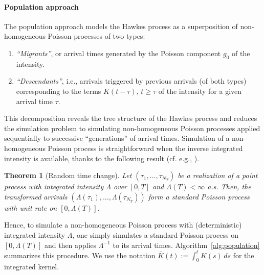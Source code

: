 \documentclass{article}
\newcommand{\1}{\mathbbm{1}}
\newtheorem{theorem}{Theorem}[section]
\numberwithin{equation}{section}
\begin{document}
\paragraph{Population approach}
The population approach \citep{Moller2005} models the Hawkes process as a superposition of non-homogeneous Poisson processes of two types:
\begin{enumerate}
    \item \textit{``Migrants''}, or arrival times generated by the Poisson component $g_0$ of the intensity.
    \item \textit{``Descendants''}, i.e., arrivals triggered by previous arrivals (of both types) corresponding to the terms $K(t - \tau), \, t \geq \tau$ of the intensity for a given arrival time $\tau$.
\end{enumerate}
This decomposition reveals the tree structure of the Hawkes process and reduces the simulation problem to simulating non-homogeneous Poisson processes applied sequentially to successive ``generations'' of arrival times. Simulation of a non-homogeneous Poisson process is straightforward when the inverse integrated intensity is available, thanks to the following result (cf. e.g., \citet{brown1988}).

\begin{theorem}[Random time change]\label{thm:time_change}
    Let $(\tau_1, \ldots, \tau_{N_T})$ be a realization of a point process with integrated intensity $\Lambda$ over $[0, T]$ and $\Lambda(T) < \infty$ a.s. Then, the transformed arrivals $(\Lambda(\tau_1), \ldots, \Lambda(\tau_{N_T}))$ form a standard Poisson process with unit rate on $[0, \Lambda(T)]$.
\end{theorem}

Hence, to simulate a non-homogeneous Poisson process with (deterministic) integrated intensity $\Lambda$, one simply simulates a standard Poisson process on $[0, \Lambda(T)]$ and then applies $\Lambda^{-1}$ to its arrival times. Algorithm~\ref{alg:population} summarizes this procedure. We use the notation $\bar K(t) := \int_0^t K(s)\,ds$ for the integrated kernel.
\end{document}
